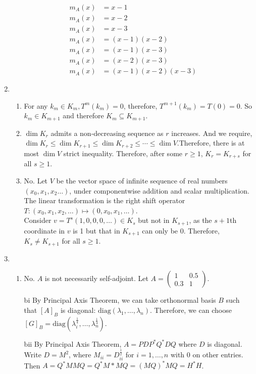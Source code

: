 \documentclass[12pt]{article}
\theoremstyle{definition}
\begin{document}
\begin{enumerate}
\begin{align*}
m_A(x)&=x-1\\
m_A(x)&=x-2\\
m_A(x)&=x-3\\
m_A(x)&=(x-1)(x-2)\\
m_A(x)&=(x-1)(x-3)\\
m_A(x)&=(x-2)(x-3)\\
m_A(x)&=(x-1)(x-2)(x-3)
\end{align*}
\item\begin{enumerate}
\item For any $k_m\in K_m, T^m(k_m)=0$, therefore, $T^{m+1}(k_m)=T(0)=0$. So $k_m\in K_{m+1}$ and therefore $K_m\subseteq K_{m+1}$.
\item $\dim K_r$ admits a non-decreasing sequence as $r$ increases. And we require, $\dim K_r\leq \dim K_{r+1}\leq \dim K_{r+2}\leq \cdots\leq \dim V$.Therefore, there is at most $\dim V$ strict inequality. Therefore, after some $r\geq 1$, $K_r = K_{r+s}$ for all $s\geq 1$.
\item No.  Let $V$ be the vector space of infinite sequence of real numbers $(x_0,x_1,x_2\ldots)$, under componentwise addition and scalar multiplication. The linear transformation is the right shift operator $T: (x_0,x_1,x_2,\ldots)\mapsto (0,x_0,x_1,\ldots)$. \\Consider $v = T^s(1,0,0,0,\ldots)\in K_{s}$ but not in $K_{s+1}$, as the $s+1$th coordinate in $v$ is 1 but that in $K_{s+1}$ can only be $0$. Therefore, $K_s\neq K_{s+1}$ for all $s\geq 1$.
\end{enumerate}
\item \begin{enumerate}
\item No. $A$ is not necessarily self-adjoint. Let $A = \begin{pmatrix} 1&0.5\\0.3&1\end{pmatrix}$.
\item[bi] By Principal Axis Theorem, we can take orthonormal basis $B$ such that $[A]_B$ is diagonal: $\text{diag}(\lambda_1,\ldots, \lambda_n)$. Therefore, we can choose $[G]_B = \text{diag}(\lambda_i^\frac{1}{4},\ldots, \lambda_n^\frac{1}{4})$. 
\item[bii] By Principal Axis Theorem, $A = PDP^\ast Q^\ast DQ$ where $D$ is diagonal. Write $D = M^2$, where $M_{ii}=D_{ii}^\frac{1}{2}$ for $i = 1,\ldots,n$ with 0 on other entries. Then $A = Q^\ast MMQ = Q^\ast M\ast MQ = (MQ)^\ast MQ = H^\ast H$.
\end{enumerate}
\end{enumerate}
\end{document}
